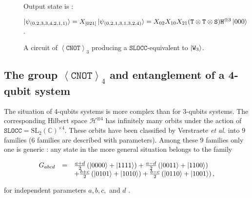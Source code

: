 \documentclass[a4paper,12pt,fleqn]{article}
\newcommand\SLOCC{\mathtt{SLOCC}}
\newcommand\W{\mathtt{W}}
\newcommand\cnot{\mathtt{CNOT}}
\newcommand\HH{\mathcal{H}}
\newcommand\C{\mathbb{C}}
\newcommand\XG[1][n]{\left<\cnot\right>_{#1}}
\begin{document}
\begin{figure}[h]
\begin{center}
 \raisebox{8mm}{\Large$\sim\ket{\W_3}$}
\end{center}

Output state is :

$\ket{\psi_{(0,2,3,3,4,2,1,1)}}=X_{[021]}\ket{\psi_{(0,2,1,3,1,3,2,4)}}=X_{02}X_{10}X_{21}(\mathtt{T}\otimes\mathtt{T}\otimes\mathtt{S})\mathtt{H}^{\otimes 3}\ket{000}$.\medskip


\caption{A circuit of $\XG[3]$ producing a $\SLOCC$-equivalent to $\ket{\W_3}$.\label{W3circ}}
  \end{figure}

  \subsection{The group $\XG[4]$ and entanglement of a 4-qubit system\label{fourqubits}}
The situation of 4-qubits systems is more complex than for 3-qubits systems.
The corresponding Hilbert space $\HH^{\otimes 4}$ has infinitely many orbits under the action
of $\SLOCC=\mathrm{SL}_2(\C)^{\times 4}$. These orbits have been classified by Verstraete \textit{et al.} \cite{2002VDDV} into 9 families (6 families are described with
parameters). Among these 9 families only one is generic : any state in the more general situation belongs to the family

\begin{equation}\begin{array}{rcl}
	G_{abcd}&=&{a+d\over 2}\left(|0000\rangle + |1111\rangle\right)+{a-d\over 2}\left(|0011\rangle+|1100\rangle\right){}
	\\&&+{b+c\over 2}\left(|0101\rangle+|1010\rangle\right)+{b-c\over 2}\left(|0110\rangle+|1001\rangle\right),\end{array}
    \end{equation}



for  independent parameters $a,b, c,$ and $d$ \cite{2002VDDV,2014HLT}.
\end{document}
